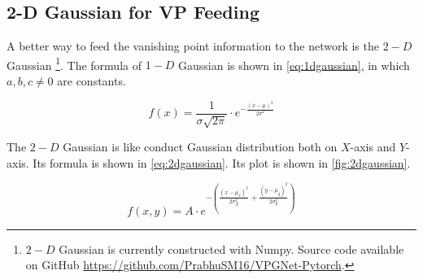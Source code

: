 \begin{spacing}{1.5}
\section{2-D Gaussian for VP Feeding}
\label{sec:MD_2D}

A better way to feed the vanishing point information to the network is the $2-D$ Gaussian{ \footnote{\raggedright $2-D$ Gaussian is currently constructed with Numpy. Source code available on GitHub \url{https://github.com/PrabhuSM16/VPGNet-Pytorch}.}}. The formula of $1-D$ Gaussian is shown in \autoref{eq:1dgaussian}, in which $a,b,c \neq 0$ are constants.

\begin{equation}
\label{eq:1dgaussian}
    f(x)=\frac{1}{\sigma \sqrt{2 \pi }} \cdot e^{-\frac{(x- \mu )^2}{2 \sigma^2}}
\end{equation}

The $2-D$ Gaussian is like conduct Gaussian distribution both on $X$-axis and $Y$-axis. Its formula is shown in \autoref{eq:2dgaussian}. Its plot is shown in \autoref{fig:2dgaussian}.

\begin{equation}
\label{eq:2dgaussian}
    f(x,y)= A \cdot e^{-\left(\frac{(x- \mu_x )^2}{2 \sigma_{X}^{2}}+\frac{(y- \mu_y )^2}{2 \sigma_{Y}^{2}}\right)}
\end{equation}


\end{spacing}

